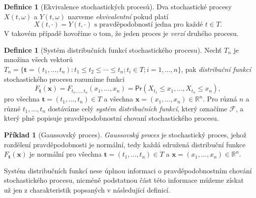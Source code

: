 \documentclass[a4paper,12pt]{report}
\theoremstyle{definition} \newtheorem{definice}[veta]{Definice}
\newtheorem{priklad}{Příklad}
\theoremstyle{remark}
\begin{document}
\begin{definice}[Ekvivalence stochastických procesů]
Dva stochastické procesy $X(t,\omega)$ a $Y(t,\omega)$ nazveme \textit{ekvivalentní} pokud platí
$$X(t,\cdot)=Y(t,\cdot)\text{ s pravděpodobností jedna pro každé }t\in T.$$ 
V takovém případě hovoříme o tom, že jeden proces je \textit{verzí} druhého procesu.
\end{definice}

\begin{definice}[Systém distribučních funkcí stochastického procesu]
Nechť $T_n$ je množina všech vektorů $T_n=\{\boldsymbol{t}=(t_1,\dots,t_n):t_1\leq t_2\leq\cdots\leq t_n; t_i\in T; i=1,\dots,n\}$,
pak \textit{distribuční funkcí} stochastického procesu rozumíme funkci
$$F_{\boldsymbol{t}}(\boldsymbol{x})=F_{t_1,\dots,t_n}(x_1,\dots,x_n)= \mathsf{Pr}(X_{t_1}\leq x_1,\dots,X_{t_n}\leq x_n),$$
pro všechna $\boldsymbol{t}=(t_1,\dots,t_n)\in T$ a všechna $\boldsymbol{x}=(x_1,\dots,x_n)\in \mathbb{R}^n$.
Pro různá $n$ a různé $t_1,\dots,t_n$ dostáváme celý \textit{systém distribučních funkcí}, který označíme $\mathcal{F}$, a který plně popisuje pravděpodobnostní chovaní stochastického procesu.

\end{definice}

\begin{priklad}[Gaussovský proces]
\textit{Gaussovský proces} je stochastický proces, jehož rozdělení pravděpodobnosti je normální, tedy každá sdružená distribuční funkce $F_{\boldsymbol{t}}(\boldsymbol{x})$ je normální pro všechna $\boldsymbol{t}=(t_1,\dots,t_n)\in T$ a $\boldsymbol{x}=(x_1,\dots,x_n)\in \mathbb{R}^n$.
\end{priklad}

Systém distribučních funkcí nese úplnou informaci o pravděpodobnostním chování stochastického procesu, nicméně podstatnou část této informace můžeme získat už jen z charakteristik popsaných v následující definicí.
\end{document}
